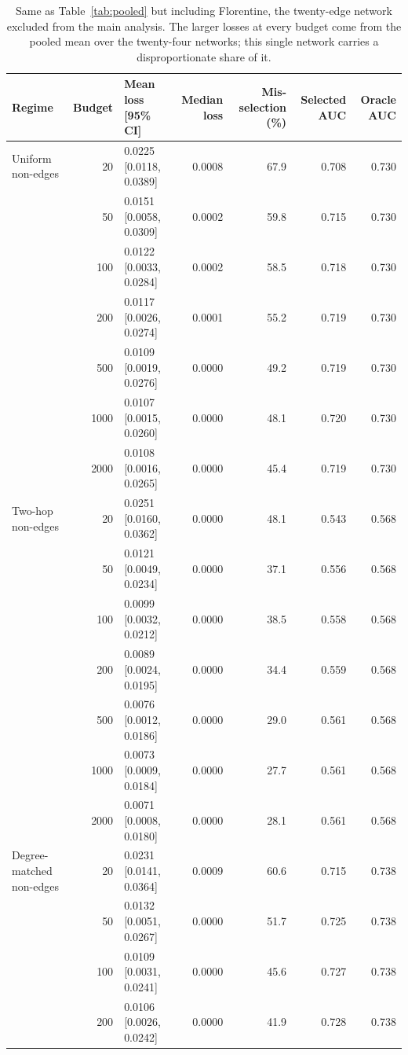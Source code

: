 \begin{table}[htbp]
\centering
\scriptsize
\setlength{\tabcolsep}{4pt}
\caption{Same as Table~\ref{tab:pooled} but including Florentine, the twenty-edge network excluded from the main analysis. The larger losses at every budget come from the pooled mean over the twenty-four networks; this single network carries a disproportionate share of it.}
\label{tab:pooled24}
\begin{tabular}{l r l r r r r}
\toprule
Regime & Budget & Mean loss [95\% CI] & Median loss & Mis-selection (\%) & Selected AUC & Oracle AUC \\
\midrule
Uniform non-edges & 20 & 0.0225 [0.0118, 0.0389] & 0.0008 & 67.9 & 0.708 & 0.730 \\
 & 50 & 0.0151 [0.0058, 0.0309] & 0.0002 & 59.8 & 0.715 & 0.730 \\
 & 100 & 0.0122 [0.0033, 0.0284] & 0.0002 & 58.5 & 0.718 & 0.730 \\
 & 200 & 0.0117 [0.0026, 0.0274] & 0.0001 & 55.2 & 0.719 & 0.730 \\
 & 500 & 0.0109 [0.0019, 0.0276] & 0.0000 & 49.2 & 0.719 & 0.730 \\
 & 1000 & 0.0107 [0.0015, 0.0260] & 0.0000 & 48.1 & 0.720 & 0.730 \\
 & 2000 & 0.0108 [0.0016, 0.0265] & 0.0000 & 45.4 & 0.719 & 0.730 \\
\addlinespace[2pt]
Two-hop non-edges & 20 & 0.0251 [0.0160, 0.0362] & 0.0000 & 48.1 & 0.543 & 0.568 \\
 & 50 & 0.0121 [0.0049, 0.0234] & 0.0000 & 37.1 & 0.556 & 0.568 \\
 & 100 & 0.0099 [0.0032, 0.0212] & 0.0000 & 38.5 & 0.558 & 0.568 \\
 & 200 & 0.0089 [0.0024, 0.0195] & 0.0000 & 34.4 & 0.559 & 0.568 \\
 & 500 & 0.0076 [0.0012, 0.0186] & 0.0000 & 29.0 & 0.561 & 0.568 \\
 & 1000 & 0.0073 [0.0009, 0.0184] & 0.0000 & 27.7 & 0.561 & 0.568 \\
 & 2000 & 0.0071 [0.0008, 0.0180] & 0.0000 & 28.1 & 0.561 & 0.568 \\
\addlinespace[2pt]
Degree-matched non-edges & 20 & 0.0231 [0.0141, 0.0364] & 0.0009 & 60.6 & 0.715 & 0.738 \\
 & 50 & 0.0132 [0.0051, 0.0267] & 0.0000 & 51.7 & 0.725 & 0.738 \\
 & 100 & 0.0109 [0.0031, 0.0241] & 0.0000 & 45.6 & 0.727 & 0.738 \\
 & 200 & 0.0106 [0.0026, 0.0242] & 0.0000 & 41.9 & 0.728 & 0.738 \\

\end{tabular}
\end{table}
